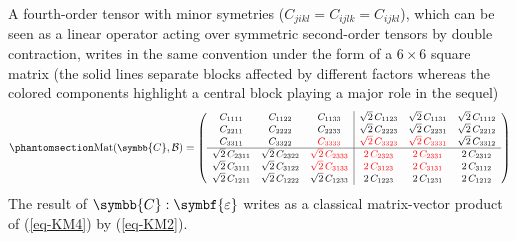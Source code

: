 \documentclass[
  a4paper,
  numbers=noendperiod,
  DIV=12]{scrreprt}
\newcommand{\uu}[1]{{\symbf{{#1}}}}
\newcommand{\uuuu}[1]{{\symbb{{#1}}}}
\newcommand{\eps}{{\uu{{\varepsilon}}}}
\DeclareMathOperator{\Mat}{Mat}
\begin{document}
A fourth-order tensor with minor symetries
(\(C_{jikl}=C_{ijlk}=C_{ijkl}\)), which can be seen as a linear operator
acting over symmetric second-order tensors by double contraction, writes
in the same convention under the form of a \(6\times 6\) square matrix
(the solid lines separate blocks affected by different factors whereas
the colored components highlight a central block playing a major role in
the sequel) \begin{equation}\protect\phantomsection\label{eq-KM4}{
\small
\Mat(\uuuu{C},\mathcal{B})=
   \left(
   \begin{array}{ccc|ccc}
   C_{1111} & C_{1122} & C_{1133} & \sqrt{2}\,C_{1123} & \sqrt{2}\,C_{1131} & \sqrt{2}\,C_{1112} \\
   C_{2211} & C_{2222} & C_{2233} & \sqrt{2}\,C_{2223} & \sqrt{2}\,C_{2231} & \sqrt{2}\,C_{2212} \\
   C_{3311} & C_{3322} & \color{red}C_{3333} & \color{red}\sqrt{2}\,C_{3323} & \color{red}\sqrt{2}\,C_{3331} & \sqrt{2}\,C_{3312} \\
   \hline
   \sqrt{2}\,C_{2311} & \sqrt{2}\,C_{2322} & \color{red}\sqrt{2}\,C_{2333} & \color{red}2\,C_{2323} & \color{red}2\,C_{2331} & 2\,C_{2312} \\
   \sqrt{2}\,C_{3111} & \sqrt{2}\,C_{3122} & \color{red}\sqrt{2}\,C_{3133} & \color{red}2\,C_{3123} & \color{red}2\,C_{3131} & 2\,C_{3112} \\
   \sqrt{2}\,C_{1211} & \sqrt{2}\,C_{1222} & \sqrt{2}\,C_{1233} & 2\,C_{1223} & 2\,C_{1231} & 2\,C_{1212}
   \end{array}
   \right)
}\end{equation} The result of \(\uuuu{C}:\eps\) writes as a classical
matrix-vector product of (\ref{eq-KM4}) by (\ref{eq-KM2}).
\end{document}
